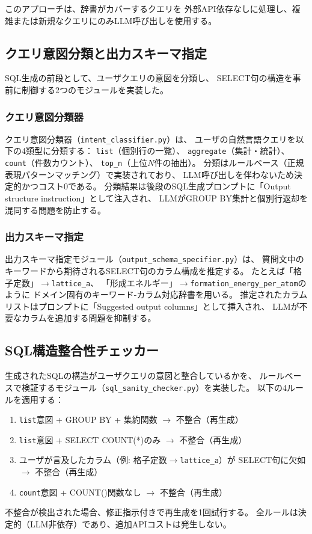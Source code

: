 \documentclass[5p,twocolumn]{elsarticle}
\begin{document}
このアプローチは、辞書がカバーするクエリを
外部API依存なしに処理し、複雑または新規なクエリにのみLLM呼び出しを使用する。

\subsection{クエリ意図分類と出力スキーマ指定}
\label{sec:output_schema_specifier}

SQL生成の前段として、ユーザクエリの意図を分類し、
SELECT句の構造を事前に制御する2つのモジュールを実装した。

\subsubsection{クエリ意図分類器}

クエリ意図分類器（\texttt{intent\_classifier.py}）は、
ユーザの自然言語クエリを以下の4類型に分類する：
\texttt{list}（個別行の一覧）、
\texttt{aggregate}（集計・統計）、
\texttt{count}（件数カウント）、
\texttt{top\_n}（上位$N$件の抽出）。
分類はルールベース（正規表現パターンマッチング）で実装されており、
LLM呼び出しを伴わないため決定的かつコスト0である。
分類結果は後段のSQL生成プロンプトに「Output structure instruction」として注入され、
LLMがGROUP BY集計と個別行返却を混同する問題を防止する。

\subsubsection{出力スキーマ指定}

出力スキーマ指定モジュール（\texttt{output\_schema\_specifier.py}）は、
質問文中のキーワードから期待されるSELECT句のカラム構成を推定する。
たとえば「格子定数」$\to$\texttt{lattice\_a}、
「形成エネルギー」$\to$\texttt{formation\_energy\_per\_atom}のように
ドメイン固有のキーワード-カラム対応辞書を用いる。
推定されたカラムリストはプロンプトに「Suggested output columns」として挿入され、
LLMが不要なカラムを追加する問題を抑制する。

\subsection{SQL構造整合性チェッカー}
\label{sec:sql_sanity_checker}

生成されたSQLの構造がユーザクエリの意図と整合しているかを、
ルールベースで検証するモジュール（\texttt{sql\_sanity\_checker.py}）を実装した。
以下の4ルールを適用する：
\begin{enumerate}[nosep]
  \item \texttt{list}意図 + GROUP BY + 集約関数 $\to$ 不整合（再生成）
  \item \texttt{list}意図 + SELECT COUNT(*)のみ $\to$ 不整合（再生成）
  \item ユーザが言及したカラム（例: 格子定数$\to$\texttt{lattice\_a}）が
        SELECT句に欠如 $\to$ 不整合（再生成）
  \item \texttt{count}意図 + COUNT()関数なし $\to$ 不整合（再生成）
\end{enumerate}
不整合が検出された場合、修正指示付きで再生成を1回試行する。
全ルールは決定的（LLM非依存）であり、追加APIコストは発生しない。
\end{document}
